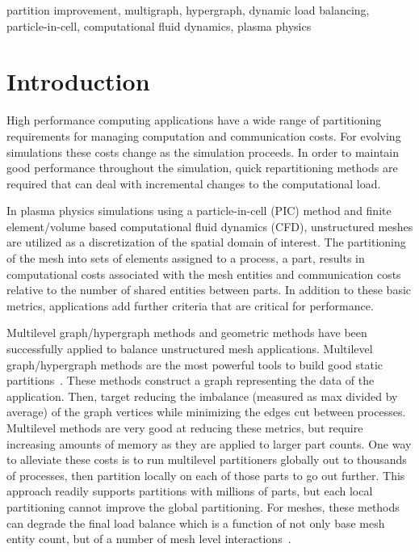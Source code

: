 \documentclass[conference]{IEEEtran}
\begin{document}
\begin{IEEEkeywords}
partition improvement, multigraph, hypergraph, dynamic load balancing,
particle-in-cell, computational fluid dynamics, plasma physics
\end{IEEEkeywords}

\section{Introduction}

High performance computing applications have a wide range of partitioning
requirements for managing computation and communication costs. For evolving simulations these
costs change as the simulation proceeds. In order to maintain good performance throughout the
simulation, quick repartitioning methods are required that can deal with incremental changes
to the computational load.

In plasma physics simulations using a particle-in-cell (PIC) method and finite
element/volume based computational fluid dynamics (CFD), unstructured meshes are utilized
as a discretization of the spatial domain of interest. The partitioning of the
mesh into sets of elements assigned to a process, a part, results in
computational costs associated with the mesh entities and communication
costs relative to the number of shared entities between parts. In addition to
these basic metrics, applications add further criteria that are critical for performance.

Multilevel graph/hypergraph methods and geometric methods have been successfully
applied to balance unstructured mesh applications.
Multilevel graph/hypergraph methods are the most powerful tools to build good static
partitions~\cite{catalyurek2013umpa,karypis1999parallel,lasalle2013multi,schloegel2002parallel}.
These methods construct a graph representing the data of the application. Then, target
reducing the imbalance (measured as max divided by average) of the graph vertices while
minimizing the edges cut between processes. Multilevel methods are very good at reducing
these metrics, but require increasing amounts of memory as they are applied to
larger part counts. One way to alleviate these costs is to run multilevel partitioners globally
out to thousands of processes, then partition locally on each of those parts to go out
further. This approach readily supports partitions with millions of parts, but each
local partitioning cannot improve the global partitioning. For meshes, these methods
can degrade the final load balance which is a function of not only base mesh
entity count, but of a number of mesh level
interactions~\cite{zhou2012unstructured,SmithParma2015}.
\end{document}
